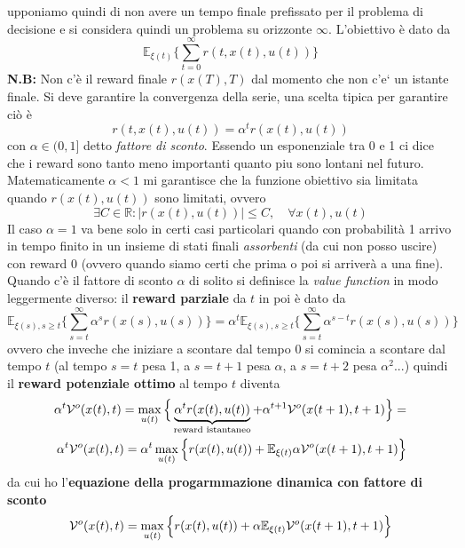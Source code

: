 upponiamo quindi di non avere un tempo finale prefissato per il problema di decisione e si considera quindi un problema su orizzonte $\infty$. L'obiettivo \`e dato da
\begin{equation}
\mathbb{E}_{\xi(t)} \Big \{ \sum_{t=0}^\infty r(t, x(t), u(t)) \Big \}
\end{equation} \textbf{N.B:} Non c'\`e il reward finale $r(x(T),T)$ dal momento che non c'e` un istante finale.
Si deve garantire la convergenza della serie, una scelta tipica per garantire ci\`o \`e
\begin{equation}
r(t, x(t), u(t)) = \alpha^t r(x(t), u(t))
\end{equation} con $\alpha \in (0,1]$ detto \textit{fattore di sconto}. Essendo un esponenziale tra 0 e 1 ci dice che i reward sono tanto meno importanti quanto piu sono lontani nel futuro. Matematicamente $\alpha < 1$ mi garantisce che la funzione obiettivo sia limitata quando $r(x(t),u(t))$ sono limitati, ovvero 
\begin{equation}
\exists C \in \mathbb{R} : |r(x(t),u(t))| \leq C, \quad \forall x(t), u(t)
\end{equation} Il caso $\alpha = 1$ va bene solo in certi casi particolari quando con probabilit\`a 1 arrivo in tempo finito in un insieme di stati finali \textit{assorbenti} (da cui non posso uscire) con reward 0 (ovvero quando siamo certi che prima o poi si arriver\`a a una fine). Quando c'\`e il fattore di sconto $\alpha$ di solito si definisce la \textit{value function} in modo leggermente diverso: il \textbf{reward parziale} da $t$ in poi \`e dato da
\begin{equation}
\mathbb{E}_{\xi(s),s \geq t} \Big \{ \sum_{s=t}^\infty \alpha^s r(x(s),u(s)) \Big \} = \alpha^t \mathbb{E}_{\xi(s),s \geq t} \Big \{ \sum_{s=t}^\infty \alpha^{s-t} r(x(s),u(s)) \Big \}
\end{equation} ovvero che inveche che iniziare a scontare dal tempo 0 si comincia a scontare dal tempo $t$ (al tempo $s=t$ pesa 1, a $s=t+1$ pesa $\alpha$, a $s=t+2$ pesa $\alpha^2$...) quindi il \textbf{reward potenziale ottimo} al tempo $t$ diventa
\begin{align}
\alpha^t \mathcal{V}^o(x(t),t) = \max_{u(t)} \Big \{ \underbrace{\alpha^t r(x(t),u(t))}_{\text{reward istantaneo}} + \alpha^{t+1}\mathcal{V}^o(x(t+1),t+1) \Big \} = \\
\alpha^t \mathcal{V}^o (x(t),t) = \alpha^t \max_{u(t)} \Big \{ r(x(t),u(t)) + \mathbb{E}_{\xi(t)} \alpha \mathcal{V}^o (x(t+1), t+1) \Big \}
\end{align} da cui ho l'\textbf{equazione della progarmmazione dinamica con fattore di sconto}
\begin{equation}
\mathcal{V}^o(x(t),t) = \max_{u(t)} \Big \{ r(x(t),u(t)) + \alpha \mathbb{E}_{\xi(t)} \mathcal{V}^o(x(t+1),t+1) \Big \}
\end{equation}

